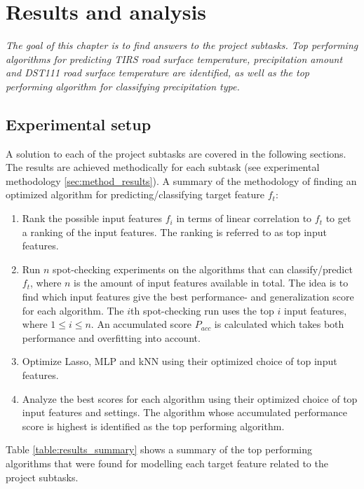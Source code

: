 \chapter{Results and analysis}
\emph{The goal of this chapter is to find answers to the project subtasks. Top performing algorithms for predicting TIRS road surface temperature, precipitation amount and DST111 road surface temperature are identified, as well as the top performing algorithm for classifying precipitation type.}

\section{Experimental setup}
	A solution to each of the project subtasks are covered in the following sections. The results are achieved methodically for each subtask (see experimental methodology \ref{sec:method_results}). A summary of the methodology of finding an optimized algorithm for predicting/classifying target feature $f_t$:
	\begin{enumerate}
		\item Rank the possible input features $f_i$ in terms of linear correlation to $f_t$ to get a ranking of the input features. The ranking is referred to as top input features.
		\item Run $n$ spot-checking experiments on the algorithms that can classify/predict $f_t$, where $n$ is the amount of input features available in total. The idea is to find which input features give the best performance- and generalization score for each algorithm. The $i$th spot-checking run uses the top $i$ input features, where $1 \leq i \leq n$. An accumulated score $P_{acc}$ is calculated which takes both performance and overfitting into account.
		\item Optimize Lasso, MLP and kNN using their optimized choice of top input features.
		\item Analyze the best scores for each algorithm using their optimized choice of top input features and settings. The algorithm whose accumulated performance score is highest is identified as the top performing algorithm.
	\end{enumerate}

	Table \ref{table:results_summary} shows a summary of the top performing algorithms that were found for modelling each target feature related to the project subtasks.
	
